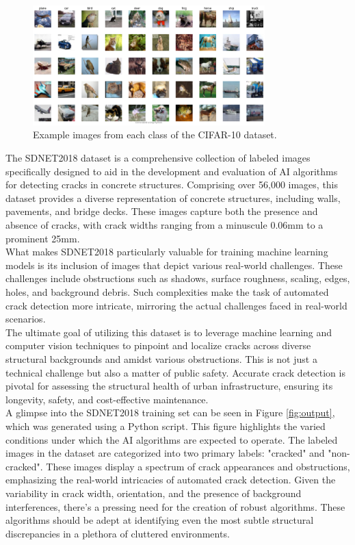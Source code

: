 \begin{figure}[h]
    \centering
    \includegraphics[width=0.8\textwidth]{figures/cifar_10_eda.png}
    \caption{Example images from each class of the CIFAR-10 dataset.}
    \label{fig:cifar_10_eda}
\end{figure}



The SDNET2018 dataset is a comprehensive collection of labeled images specifically designed to aid in the development and evaluation of AI algorithms for detecting cracks in concrete structures. Comprising over 56,000 images, this dataset provides a diverse representation of concrete structures, including walls, pavements, and bridge decks. These images capture both the presence and absence of cracks, with crack widths ranging from a minuscule 0.06mm to a prominent 25mm.\\

What makes SDNET2018 particularly valuable for training machine learning models is its inclusion of images that depict various real-world challenges. These challenges include obstructions such as shadows, surface roughness, scaling, edges, holes, and background debris. Such complexities make the task of automated crack detection more intricate, mirroring the actual challenges faced in real-world scenarios.\\

The ultimate goal of utilizing this dataset is to leverage machine learning and computer vision techniques to pinpoint and localize cracks across diverse structural backgrounds and amidst various obstructions. This is not just a technical challenge but also a matter of public safety. Accurate crack detection is pivotal for assessing the structural health of urban infrastructure, ensuring its longevity, safety, and cost-effective maintenance.\\

A glimpse into the SDNET2018 training set can be seen in Figure \ref{fig:output}, which was generated using a Python script. This figure highlights the varied conditions under which the AI algorithms are expected to operate. The labeled images in the dataset are categorized into two primary labels: "cracked" and "non-cracked". These images display a spectrum of crack appearances and obstructions, emphasizing the real-world intricacies of automated crack detection. Given the variability in crack width, orientation, and the presence of background interferences, there's a pressing need for the creation of robust algorithms. These algorithms should be adept at identifying even the most subtle structural discrepancies in a plethora of cluttered environments.\\

